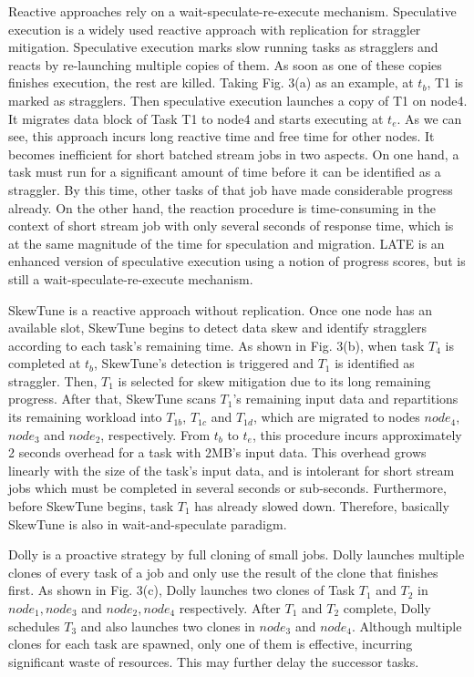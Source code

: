 \documentclass[10pt,conference,compsocconf,letterpaper]{IEEEtran}
\begin{document}
  Reactive approaches rely on a wait-speculate-re-execute mechanism. Speculative execution \cite{Dean2004} is a widely used reactive approach with replication for straggler mitigation. Speculative execution marks slow running tasks as stragglers and reacts by re-launching multiple copies of them. As soon as one of these copies finishes execution, the rest are killed. Taking Fig. 3(a) as an example, at $t_b$, T1 is marked as stragglers. Then speculative execution launches a copy of T1 on node4. It migrates data block of Task T1 to node4 and starts executing at $t_e$. As we can see, this approach incurs long reactive time and free time for other nodes. It becomes inefficient for short batched stream jobs in two aspects. On one hand, a task must run for a significant amount of time before it can be identified as a straggler. By this time, other tasks of that job have made considerable progress already. On the other hand, the reaction procedure is time-consuming in the context of short stream job with only several seconds of response time, which is at the same magnitude of the time for speculation and migration. LATE \cite{Zaharia2008} is an enhanced version of speculative execution using a notion of progress scores, but is still a wait-speculate-re-execute mechanism.

   SkewTune \cite{Kwon2012} is  a reactive approach  without replication. Once one node has an available slot, SkewTune begins to detect data skew and identify stragglers according to each task's remaining time. As shown in Fig. 3(b), when task $T_4$ is completed at $t_b$, SkewTune's detection is triggered and $T_1$ is identified as straggler. Then, $T_1$ is selected for skew mitigation due to its long remaining progress. After that, SkewTune scans $T_1$'s remaining input data and repartitions its remaining workload into $T_{1b}$, $T_{1c}$ and $T_{1d}$, which  are  migrated to nodes $node_4$, $node_3$ and $node_2$, respectively. From $t_b$ to $t_e$, this procedure incurs approximately 2 seconds overhead for a task with 2MB's input data. This overhead grows linearly with the size of the task's input data, and is intolerant for short stream jobs which must be completed in several seconds or sub-seconds. Furthermore, before SkewTune begins, task $T_1$ has already slowed down. Therefore, basically SkewTune is also in wait-and-speculate paradigm.

  Dolly \cite{Ananthanarayanan2013} is a proactive strategy by full cloning of small jobs. Dolly launches multiple clones of every task of a job and only use the result of the clone that finishes first. As shown in Fig. 3(c), Dolly launches two clones of Task $T_1$ and $T_2$ in $node_1, node_3$ and $node_2, node_4$ respectively. After $T_1$ and $T_2$ complete, Dolly schedules $T_3$ and also launches two clones in $node_3$ and $node_4$. Although multiple clones for each task are spawned, only one of them is effective, incurring significant waste of resources. This may further delay the successor tasks.
\end{document}
